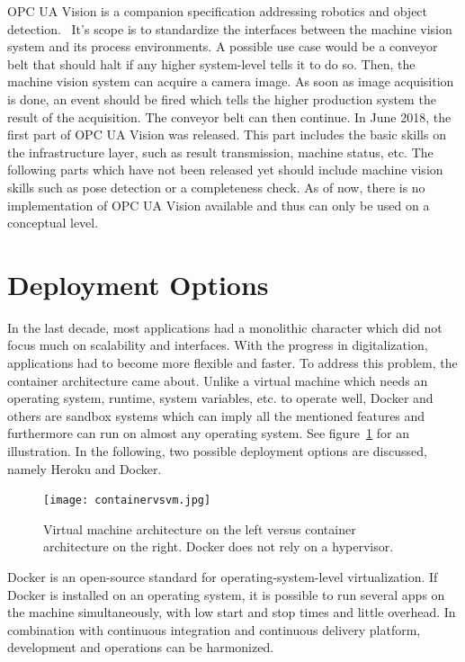 OPC UA Vision is a companion specification addressing robotics and object detection.~\cite{VDMA2018OPCSpecification} It's scope is to standardize the interfaces between the machine vision system and its process environments. A possible use case would be a conveyor belt that should halt if any higher system-level tells it to do so. Then, the machine vision system can acquire a camera image. As soon as image acquisition is done, an event should be fired which tells the higher production system the result of the acquisition. The conveyor belt can then continue. \newline
In June 2018, the first part of OPC UA Vision was released. This part includes the basic skills on the infrastructure layer, such as result transmission, machine status, etc. The following parts which have not been released yet should include machine vision skills such as pose detection or a completeness check. As of now, there is no implementation of OPC UA Vision available and thus can only be used on a conceptual level.

\section {Deployment Options}
\label{deploymentoptions}
In the last decade, most applications had a monolithic character which did not focus much on scalability and interfaces. With the progress in digitalization, applications had to become more flexible and faster. To address this problem, the container architecture came about. Unlike a virtual machine which needs an operating system, runtime, system variables, etc. to operate well, Docker and others are sandbox systems which can imply all the mentioned features and furthermore can run on almost any operating system. See figure~\ref{container} for an illustration. In the following, two possible deployment options are discussed, namely Heroku and Docker.~\cite{Wurbs2017Docker2018.}

\begin{figure}[ht]
	\centering
  \texttt{[image: containervsvm.jpg]}
	\caption[Docker vs Virtual Machine Architecture]{Virtual machine architecture on the left versus container architecture on the right. Docker does not rely on a hypervisor.~\cite{Wurbs2017Docker2018.}}
	\label{container}
\end{figure}

Docker is an open-source standard for operating-system-level virtualization. If Docker is installed on an operating system, it is possible to run several apps on the machine simultaneously, with low start and stop times and little overhead. In combination with continuous integration and continuous delivery platform, development and operations can be harmonized.


